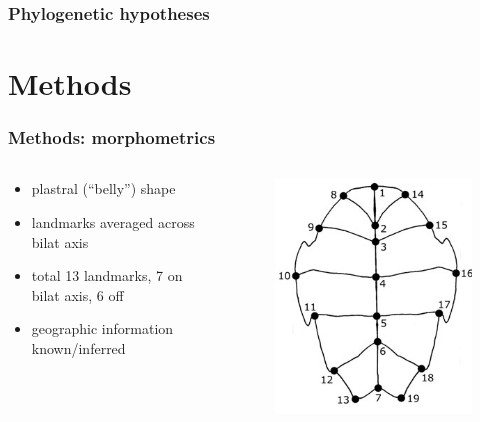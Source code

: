\documentclass{beamer}\usepackage{graphicx, color}
\begin{document}
\begin{frame}
  \frametitle{Phylogenetic hypotheses}

 
\end{frame}


\section{Methods}
\begin{frame}
  \frametitle{Methods: morphometrics}
  \begin{columns}
    \begin{column}{0.5\textwidth}
      \begin{itemize}
        \item plastral (``belly'') shape
        \item landmarks averaged across bilat axis
        \item total 13 landmarks, 7 on bilat axis, 6 off
        \item geographic information known/inferred
      \end{itemize}
    \end{column}
    \begin{column}{0.5\textwidth}
      \begin{figure}[h]
        \centering
        \captionsetup{justification = raggedleft, slc = off}
        \includegraphics[width = \textwidth, keepaspectratio = true]{figure/plastra}

\end{figure}
\end{column}
\end{columns}
\end{frame}
\end{document}
